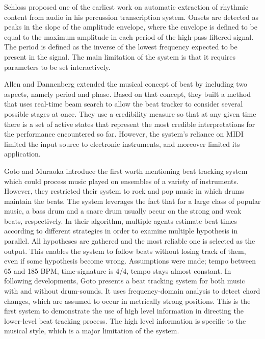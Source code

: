 \documentclass{scrartcl}
\begin{document}
Schloss \cite{Schloss1985} proposed one of the earliest work on automatic extraction of rhythmic content from audio in his percussion transcription system. Onsets are detected as peaks in the slope of the amplitude envelope, where the envelope is defined to be equal to the maximum amplitude in each period of the high-pass filtered signal. The period is defined as the inverse of the lowest frequency expected to be present in the signal. The main limitation of the system is that it requires parameters to be set interactively. 

Allen and Dannenberg \cite{Allen1990} extended the musical concept of beat by including two aspects, namely period and phase. Based on that concept, they built a method that uses real-time beam search to allow the beat tracker to consider several possible stages at once. They use a credibility measure so that at any given time there is a set of active states that represent the most credible interpretations for the performance encountered so far. However, the system's reliance on MIDI limited the input source to electronic instruments, and moreover limited its application.

Goto and Muraoka \cite{Goto1994} introduce the first worth mentioning beat tracking system which could process music played on ensembles of a variety of instruments. However, they restricted their system to rock and pop music in which drums maintain the beats. The system leverages the fact that for a large class of popular music, a bass drum and a snare drum usually occur on the strong and weak beats, respectively. In their algorithm, multiple agents estimate beat times according to different strategies in order to examine multiple hypothesis in parallel. All hypotheses are gathered and the most reliable one is selected as the output. This enables the system to follow beats without losing track of them, even if some hypothesis become wrong. Assumptions were made; tempo between 65 and 185 BPM, time-signature is 4/4, tempo stays almost constant. In following developments, Goto \cite{Goto2001} presents a beat tracking system for both music with and without drum-sounds. It uses frequency-domain analysis to detect chord changes, which are assumed to occur in metrically strong positions. This is the first system to demonstrate the use of high level information in directing the lower-level beat tracking process. The high level information is specific to the musical style, which is a major limitation of the system.  
\end{document}
